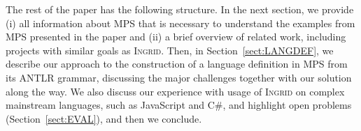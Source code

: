 The rest of the paper has the following structure.
In the next section, we provide (i) all information about MPS that is necessary to understand the examples from MPS presented in the paper and (ii) a brief overview of related work, including projects with similar goals as \textsc{Ingrid}.
Then, in Section~\ref{sect:LANGDEF}, we describe our approach to the construction of a language definition in MPS from its ANTLR grammar, discussing the major challenges together with our solution along the way.
We also discuss our experience with usage of \textsc{Ingrid} on complex mainstream languages, such as JavaScript and C\#, and highlight open problems (Section~\ref{sect:EVAL}), and then we conclude.

